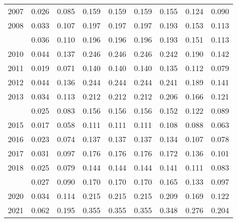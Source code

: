 \documentclass[
]{article}
\begin{document}
\begin{longtable}[t]{lrrrrrrrr}
2007 & 0.026 & 0.085 & 0.159 & 0.159 & 0.159 & 0.155 & 0.124 & 0.090\\
2008 & 0.033 & 0.107 & 0.197 & 0.197 & 0.197 & 0.193 & 0.153 & 0.113\\
\addlinespace
2009 & 0.036 & 0.110 & 0.196 & 0.196 & 0.196 & 0.193 & 0.151 & 0.113\\
2010 & 0.044 & 0.137 & 0.246 & 0.246 & 0.246 & 0.242 & 0.190 & 0.142\\
2011 & 0.019 & 0.071 & 0.140 & 0.140 & 0.140 & 0.135 & 0.112 & 0.079\\
2012 & 0.044 & 0.136 & 0.244 & 0.244 & 0.244 & 0.241 & 0.189 & 0.141\\
2013 & 0.034 & 0.113 & 0.212 & 0.212 & 0.212 & 0.206 & 0.166 & 0.121\\
\addlinespace
2014 & 0.025 & 0.083 & 0.156 & 0.156 & 0.156 & 0.152 & 0.122 & 0.089\\
2015 & 0.017 & 0.058 & 0.111 & 0.111 & 0.111 & 0.108 & 0.088 & 0.063\\
2016 & 0.023 & 0.074 & 0.137 & 0.137 & 0.137 & 0.134 & 0.107 & 0.078\\
2017 & 0.031 & 0.097 & 0.176 & 0.176 & 0.176 & 0.172 & 0.136 & 0.101\\
2018 & 0.025 & 0.079 & 0.144 & 0.144 & 0.144 & 0.141 & 0.111 & 0.083\\
\addlinespace
2019 & 0.027 & 0.090 & 0.170 & 0.170 & 0.170 & 0.165 & 0.133 & 0.097\\
2020 & 0.034 & 0.114 & 0.215 & 0.215 & 0.215 & 0.209 & 0.169 & 0.122\\
2021 & 0.062 & 0.195 & 0.355 & 0.355 & 0.355 & 0.348 & 0.276 & 0.204\\*
\end{longtable}
\end{document}
